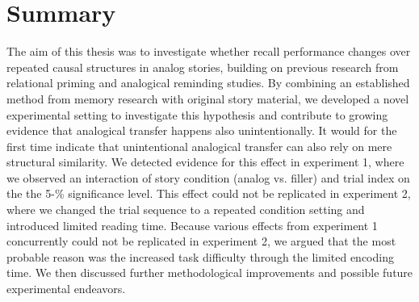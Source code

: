 \documentclass[a4paper,man,natbib,floatsintext,import]{apa6}
\begin{document}
\section{Summary}
The aim of this thesis was to investigate whether recall performance changes over repeated causal structures  in analog stories, building on previous research from relational priming and analogical reminding studies. By combining an established method from memory research with original story material, we developed a novel experimental setting to investigate this hypothesis and contribute to growing evidence that analogical transfer happens also unintentionally. It would for the first time indicate that unintentional analogical transfer can also rely on mere structural similarity. We detected evidence for this effect in experiment 1, where we observed an interaction of story condition (analog vs. filler) and trial index on the the 5-\% significance level. This effect could not be replicated in experiment 2, where we changed the trial sequence to a repeated condition setting and introduced limited reading time. Because various effects from experiment 1 concurrently could not be replicated in experiment 2, we argued that the most probable reason was the increased task difficulty through the limited encoding time. We then discussed further methodological improvements and possible future experimental endeavors.



%

\end{document}
